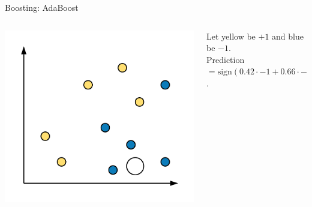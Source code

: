 \documentclass[aspectratio=169,10pt]{beamer}
\newcommand{\fitpic}[1]{\begin{adjustbox}{max width=\linewidth, max totalheight=0.78\textheight}#1\end{adjustbox}}
\begin{document}
\begin{frame}{Boosting: AdaBoost}
\begin{columns}
\begin{column}{0.33\textwidth}
      \vspace{-8pt}
    \end{column}
  \end{columns}

  \vspace{0.3cm}
  \begin{columns}
    \pause\begin{column}{0.5\textwidth}\centering
      \fitpic{\includegraphics[scale=0.1]{../assets/ensemble/diagrams/testing}}
    \end{column}
    \begin{column}{0.5\textwidth}
      \pause Let yellow be $+1$ and blue be $-1$.\\[0.3em]
      \pause Prediction $= \mathrm{sign}(0.42\cdot{-1} + 0.66\cdot{-1} + 0.99\cdot{+1}) = \text{Negative (blue)}$.
    \end{column}
  \end{columns}
\end{frame}
\end{document}
